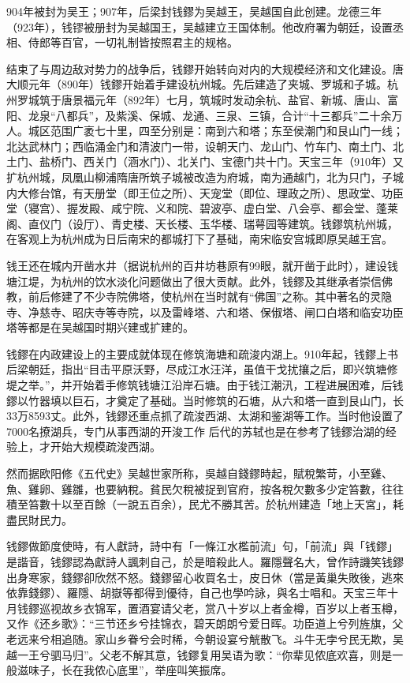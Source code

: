 904年被封为吴王；907年，后梁封钱鏐为吴越王，吴越国自此创建。龙德三年（923年），钱镠被册封为吴越国王，吴越建立王国体制。他改府署为朝廷，设置丞相、侍郎等百官，一切礼制皆按照君主的规格。

结束了与周边敌对势力的战争后，钱鏐开始转向对内的大规模经济和文化建设。唐大顺元年（890年）钱鏐开始着手建设杭州城。先后建造了夹城、罗城和子城。杭州罗城筑于唐景福元年（892年）七月，筑城时发动余杭、盐官、新城、唐山、富阳、龙泉“八都兵”，及紫溪、保城、龙通、三泉、三镇，合计“十三都兵”二十余万人。城区范围广袤七十里，四至分别是：南到六和塔；东至侯潮门和艮山门一线；北达武林门；西临涌金门和清波门一带，设朝天门、龙山门、竹车门、南土门、北土门、盐桥门、西关门（涵水门）、北关门、宝德门共十门。天宝三年（910年）又扩杭州城，凤凰山柳浦隋唐所筑子城被改造为府城，南为通越门，北为只门，子城内大修台馆，有天册堂（即王位之所）、天宠堂（即位、理政之所）、思政堂、功臣堂（寝宫）、握发殿、咸宁院、义和院、碧波亭、虚白堂、八会亭、都会堂、蓬莱阁、直仪门（设厅）、青史楼、天长楼、玉华楼、瑞萼园等建筑。钱鏐筑杭州城，在客观上为杭州成为日后南宋的都城打下了基础，南宋临安宫城即原吴越王宫。

钱王还在城内开凿水井（据说杭州的百井坊巷原有99眼，就开凿于此时），建设钱塘江堤，为杭州的饮水淡化问题做出了很大贡献。此外，钱鏐及其继承者崇信佛教，前后修建了不少寺院佛塔，使杭州在当时就有“佛国”之称。其中著名的灵隐寺、净慈寺、昭庆寺等寺院，以及雷峰塔、六和塔、保俶塔、闸口白塔和临安功臣塔等都是在吴越国时期兴建或扩建的。

钱鏐在内政建设上的主要成就体现在修筑海塘和疏浚内湖上。910年起，钱鏐上书后梁朝廷，指出“目击平原沃野，尽成江水汪洋，虽值干戈扰攘之后，即兴筑塘修堤之举。”，并开始着手修筑钱塘江沿岸石塘。由于钱江潮汛，工程进展困难，后钱鏐以竹器填以巨石，才奠定了基础。当时修筑的石塘，从六和塔一直到艮山门，长33万8593丈。此外，钱鏐还重点抓了疏浚西湖、太湖和鉴湖等工作。当时他设置了7000名撩湖兵，专门从事西湖的开浚工作 后代的苏轼也是在参考了钱鏐治湖的经验上，才开始大规模疏浚西湖。

然而据欧阳修《五代史》吴越世家所称，吳越自錢鏐時起，賦稅繁苛，小至雞、魚、雞卵、雞雛，也要納稅。貧民欠稅被捉到官府，按各稅欠數多少定笞數，往往積至笞數十以至百餘（一說五百余），民尤不勝其苦。於杭州建造「地上天宮」，耗盡民財民力。

钱鏐做節度使時，有人獻詩，詩中有「一條江水檻前流」句，「前流」與「钱鏐」是諧音，钱鏐認為獻詩人諷刺自己，於是暗殺此人。羅隱聲名大，曾作詩譏笑钱鏐出身寒家，錢鏐卻欣然不怒。錢鏐留心收買名士，皮日休（當是黃巢失敗後，逃來依靠錢鏐）、羅隱、胡嶽等都得到優待，自己也學吟詠，與名士唱和。天宝三年十月钱鏐巡视故乡衣锦军，置酒宴请父老，赏八十岁以上者金樽，百岁以上者玉樽，又作《还乡歌》：“三节还乡兮挂锦衣，碧天朗朗兮爱日晖。功臣道上兮列旌旗，父老远来兮相追随。家山乡眷兮会时稀，今朝设宴兮觥散飞。斗牛无孛兮民无欺，吴越一王兮驷马归”。父老不解其意，钱鏐复用吴语为歌：“你辈见侬底欢喜，则是一般滋味子，长在我侬心底里”，举座叫笑振席。

